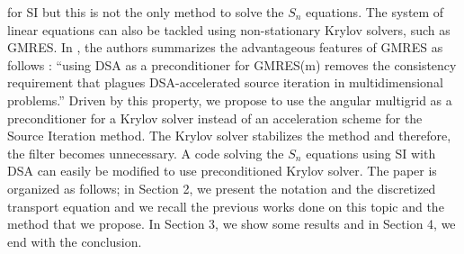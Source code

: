 for SI but this is not the only method to solve the $S_n$ equations. The system 
of linear equations can also be tackled using non-stationary Krylov solvers, 
such as GMRES. In \cite{ttg}, the authors 
summarizes the advantageous features of GMRES as follows : ``using DSA as a 
preconditioner for GMRES(m) removes the consistency requirement that plagues 
DSA-accelerated source iteration in multidimensional problems.'' Driven by this
property, we propose to use the angular multigrid as a preconditioner for a 
Krylov solver instead of an acceleration scheme for the Source Iteration
method. The Krylov solver stabilizes the method and therefore, the filter becomes
unnecessary. A code solving the $S_n$ equations using SI with DSA can easily
be modified to use preconditioned Krylov solver. The paper is organized as 
follows; in Section 2, we present the
notation and the discretized transport equation and we recall the
previous works done on this topic and the method that we propose. In Section
3, we show some results and in Section 4, we end with the conclusion.
